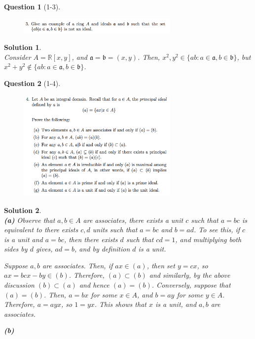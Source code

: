 \documentclass[11pt]{article}
\theoremstyle{plain}
\theoremstyle{quest}
\newtheorem*{question}{Question}
\newtheorem*{solution}{Solution}
\begin{document}
\newpage

\begin{question}[1-3]
\hfill
\begin{figure}[h!]
  \centering
    \includegraphics[width=0.7\textwidth]{ANT-s1-p3.png}
\end{figure}
\end{question}
\begin{solution} \hfill \\
Consider $A = \mathbb{R}[x,y]$, and $\mathfrak{a} = \mathfrak{b} = (x,y)$. 
Then, $x^2 , y^2 \in \{ab : a \in \mathfrak{a}, b \in \mathfrak{b}\}$, 
but $x^2 + y^2 \not\in \{ab : a \in \mathfrak{a}, b \in \mathfrak{b} \}$.   
\end{solution}

\newpage

\begin{question}[1-4]
\hfill
\begin{figure}[h!]
  \centering
    \includegraphics[width=0.7\textwidth]{ANT-s1-p4.png}
\end{figure}
\end{question}
\begin{solution} \hfill \\
\textbf{(a)} Observe that $a,b \in A$ are associates, there exists a unit $c$ such that
$a = bc$ is equivalent to there exists $c,d$ units such that $a = bc$  and $b = ad$.
To see this, if $c$ is a unit and $a = bc$, then there exists $d$ such that $cd = 1$,
and multiplying both sides by $d$ gives, $ad = b$, and by definition $d$ is a unit.

\smallskip

\noindent Suppose $a,b$ are associates. Then, if $ax \in (a)$, then set $y = cx$,
so $ax = bcx - by \in (b)$. Therefore, $(a) \subset (b)$ and similarly, by the
above discussion $(b) \subset (a)$ and hence $(a) = (b)$. Conversely, suppose
that $(a) = (b)$. Then, $a = bx$ for some $x \in A$, and $b = ay$ for some $y \in A$.
Therefore, $a = ayx$, so $1 = yx$. This shows that $x$ is a unit, and $a,b$
are associates. 

\bigskip

\noindent \textbf{(b)} 
 

\end{solution}
\end{document}
